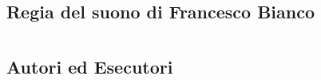 \documentclass[8pt, twoside, a5paper]{extreport}
\begin{document}
{\fontsize{30}{30} }

\subsection*{\textsf{Regia del suono di Francesco Bianco}}

\bigskip

\begin{multicols}{2}

%


\end{multicols}

\clearpage





\section*{ }

\subsection*{\textsf{Autori ed Esecutori}\\}

{\fontsize{30}{30} }

\bigskip
\end{document}
